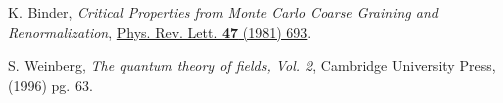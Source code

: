 \documentclass[11pt,a4paper]{article}
\begin{document}
\begin{thebibliography}{9}
K. Binder,
\textit{Critical Properties from Monte Carlo Coarse Graining and Renormalization},
\href{https://doi.org/10.1103/PhysRevLett.47.693}{Phys. Rev. Lett. \textbf{47} (1981) 693}.

S. Weinberg,
\textit{The quantum theory of fields, Vol. 2}, Cambridge University Press, (1996) pg. 63.
\end{thebibliography}
\end{document}
